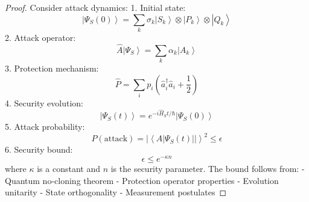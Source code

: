 \documentclass[12pt]{article}
\newcommand{\ket}[1]{\left|#1\right\rangle}
\newcommand{\braket}[2]{\left\langle#1|#2\right\rangle}
\newcommand{\op}[1]{\hat{#1}}
\begin{document}
\begin{proof}
Consider attack dynamics:
1. Initial state:
\begin{equation}
\ket{\Psi_S(0)} = \sum_k \sigma_k\ket{S_k} \otimes \ket{P_k} \otimes \ket{Q_k}
\end{equation}
2. Attack operator:
\begin{equation}
\op{A}\ket{\Psi_S} = \sum_k \alpha_k\ket{A_k}
\end{equation}
3. Protection mechanism:
\begin{equation}
\op{P} = \sum_i p_i(\op{a}_i^\dagger\op{a}_i + \frac{1}{2})
\end{equation}
4. Security evolution:
\begin{equation}
\ket{\Psi_S(t)} = e^{-i\op{H}_St/\hbar}\ket{\Psi_S(0)}
\end{equation}
5. Attack probability:
\begin{equation}
P(\text{attack}) = |\braket{A|\Psi_S(t)}|^2 \leq \epsilon
\end{equation}
6. Security bound:
\begin{equation}
\epsilon \leq e^{-\kappa n}
\end{equation}
where $\kappa$ is a constant and $n$ is the security parameter.
The bound follows from:
- Quantum no-cloning theorem
- Protection operator properties
- Evolution unitarity
- State orthogonality
- Measurement postulates
\end{proof}
\end{document}
